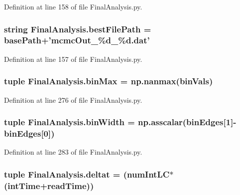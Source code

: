 Definition at line 158 of file Final\-Analysis.\-py.

\hypertarget{namespace_final_analysis_a8286808e6828d6957c0b9b9159314b08}{
\subsubsection[{best\-File\-Path}]{\setlength{\rightskip}{0pt plus 5cm}string Final\-Analysis.\-best\-File\-Path = base\-Path+'mcmc\-Out\-\_\-\%d\-\_\-\%d.\-dat'}}\label{namespace_final_analysis_a8286808e6828d6957c0b9b9159314b08}


Definition at line 157 of file Final\-Analysis.\-py.

\hypertarget{namespace_final_analysis_ae53b90e1254d309f41585c93c7d59100}{
\subsubsection[{bin\-Max}]{\setlength{\rightskip}{0pt plus 5cm}tuple Final\-Analysis.\-bin\-Max = np.\-nanmax(bin\-Vals)}}\label{namespace_final_analysis_ae53b90e1254d309f41585c93c7d59100}


Definition at line 276 of file Final\-Analysis.\-py.

\hypertarget{namespace_final_analysis_ac252eee289b29b77df2090f24e7f6dfb}{
\subsubsection[{bin\-Width}]{\setlength{\rightskip}{0pt plus 5cm}tuple Final\-Analysis.\-bin\-Width = np.\-asscalar(bin\-Edges\mbox{[}1\mbox{]}-\/bin\-Edges\mbox{[}0\mbox{]})}}\label{namespace_final_analysis_ac252eee289b29b77df2090f24e7f6dfb}


Definition at line 283 of file Final\-Analysis.\-py.

\hypertarget{namespace_final_analysis_aa27dc5884cf09a2ac3f1fb3489bb359b}{
\subsubsection[{deltat}]{\setlength{\rightskip}{0pt plus 5cm}tuple Final\-Analysis.\-deltat = ({\bf num\-Int\-L\-C}$\ast$({\bf int\-Time}+{\bf read\-Time}))}}\label{namespace_final_analysis_aa27dc5884cf09a2ac3f1fb3489bb359b}


